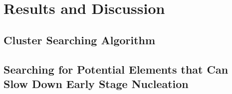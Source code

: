 \section{Results and Discussion}
\label{Chap:Al/Vac:section:RD}
\subsection{Cluster Searching Algorithm}
\subsection{Searching for Potential Elements that Can Slow Down Early Stage Nucleation}